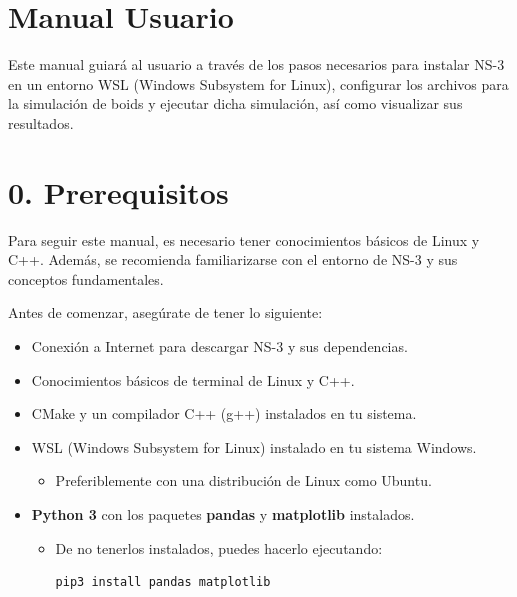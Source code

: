\documentclass{article}
\begin{document}
\section{Manual Usuario}\label{sec:man_u}

Este manual guiará al usuario a través de los pasos necesarios para instalar NS-3 en un entorno WSL (Windows Subsystem for Linux), configurar los archivos para la simulación de boids y ejecutar dicha simulación, así como visualizar sus resultados.

\section*{\textbf{0. Prerequisitos}}

Para seguir este manual, es necesario tener conocimientos básicos de Linux y C++. Además, se recomienda familiarizarse con el entorno de NS-3 y sus conceptos fundamentales.


Antes de comenzar, asegúrate de tener lo siguiente:
\begin{itemize}
    \item Conexión a Internet para descargar NS-3 y sus dependencias.
    \item Conocimientos básicos de terminal de Linux y C++.
    \item CMake y un compilador C++ (g++) instalados en tu sistema.
    \item WSL (Windows Subsystem for Linux) instalado en tu sistema Windows.
        \begin{itemize}
            \item Preferiblemente con una distribución de Linux como Ubuntu.
        \end{itemize}
    \item \textbf{Python 3} con los paquetes \textbf{pandas} y \textbf{matplotlib} instalados.
        \begin{itemize}
            \item De no tenerlos instalados, puedes hacerlo ejecutando:
            \begin{lstlisting}
pip3 install pandas matplotlib
            \end{lstlisting}
        \end{itemize}
\end{itemize}
\end{document}
